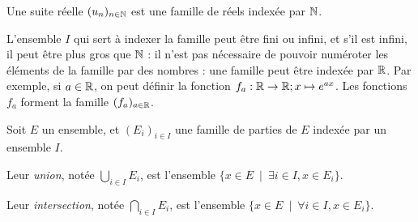 \begin{exemple}
Une suite réelle $(u_n)_{n\in \mathbb{N}}$ est une famille de réels indexée par $\mathbb{N}$.
\end{exemple}

L'ensemble $I$ qui sert à indexer la famille peut être fini ou infini, et s'il est infini, il peut être plus gros que $\mathbb{N}$ : il n'est pas nécessaire de pouvoir numéroter les éléments de la famille par des nombres : une famille peut être indexée par $\mathbb{R}$. Par exemple, si $a\in \mathbb{R}$, on peut définir la fonction $f_a : \mathbb{R}\to \mathbb{R}; x\mapsto e^{ax}$. Les fonctions $f_a$ forment la famille $(f_a)_{a\in \mathbb{R}}$.


\begin{definition}
Soit $E$ un ensemble, et $(E_i)_{i\in I}$ une famille de parties de $E$ indexée par un ensemble $I$.

Leur \emph{union}, notée $\bigcup_{i\in I} E_i$, est l'ensemble $\{x\in E\:\mid\: \exists i\in I, x\in E_i\}$.

Leur \emph{intersection}, notée $\bigcap_{i\in I} E_i$, est l'ensemble $\{x\in E\:\mid\: \forall i\in I, x\in E_i\}$.
\end{definition}


